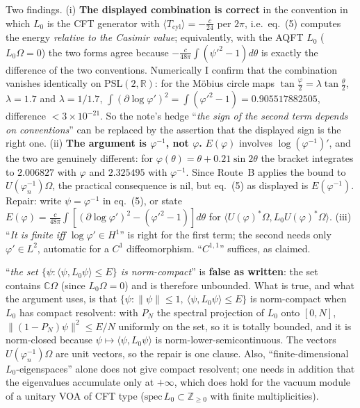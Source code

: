 \documentclass[11pt]{article}
\begin{document}
\begin{verdictgap}
Two findings.
(i) \textbf{The displayed combination is correct} in the convention in which $L_0$ is the CFT generator with
$\langle T_{\mathrm{cyl}}\rangle=-\frac c{24}$ per $2\pi$, i.e.\ eq.~(5) computes the energy \emph{relative to the
Casimir value}; equivalently, with the AQFT $L_0$ ($L_0\Omega=0$) the two forms agree because
$-\frac c{48\pi}\int(\psi'^2-1)d\theta$ is exactly the difference of the two conventions.  Numerically I confirm
that the combination vanishes identically on $\mathrm{PSL}(2,\mathbb R)$: for the M\"obius circle maps
$\tan\frac\varphi2=\lambda\tan\frac\theta2$, $\lambda=1.7$ and $\lambda=1/1.7$,
$\int(\partial\log\varphi')^2=\int(\varphi'^2-1)=0.905517882505$, difference $<3\times10^{-21}$.  So the note's
hedge ``\emph{the sign of the second term depends on conventions}'' can be replaced by the assertion that the
displayed sign is the right one.
(ii) \textbf{The argument is $\varphi^{-1}$, not $\varphi$.}  $E(\varphi)$ involves $\log(\varphi^{-1})'$, and the
two are genuinely different: for $\varphi(\theta)=\theta+0.21\sin2\theta$ the bracket integrates to
$2.006827$ with $\varphi$ and $2.325495$ with $\varphi^{-1}$.  Since Route~B applies the bound to
$U(\varphi_n^{-1})\Omega$, the practical consequence is nil, but eq.~(5) as displayed is $E(\varphi^{-1})$.
Repair: write $\psi=\varphi^{-1}$ in eq.~(5), or state $E(\varphi)=\frac c{48\pi}\int[(\partial\log\varphi')^2-(\varphi'^2-1)]d\theta$
for $\langle U(\varphi)^*\Omega,L_0U(\varphi)^*\Omega\rangle$.
(iii) ``\emph{It is finite iff $\log\varphi'\in H^1$}'' is right for the first term; the second needs only
$\varphi'\in L^2$, automatic for a $C^1$ diffeomorphism.  ``$C^{1,1}$'' suffices, as claimed.
\end{verdictgap}
\begin{verdictgap}
``\emph{the set $\{\psi:\langle\psi,L_0\psi\rangle\le E\}$ is norm-compact}'' is \textbf{false as written}: the
set contains $\mathbb C\Omega$ (since $L_0\Omega=0$) and is therefore unbounded.  What is true, and what the
argument uses, is that $\{\psi:\|\psi\|\le1,\ \langle\psi,L_0\psi\rangle\le E\}$ is norm-compact when $L_0$ has
compact resolvent: with $P_N$ the spectral projection of $L_0$ onto $[0,N]$, $\|(1-P_N)\psi\|^2\le E/N$ uniformly
on the set, so it is totally bounded, and it is norm-closed because $\psi\mapsto\langle\psi,L_0\psi\rangle$ is
norm-lower-semicontinuous.  The vectors $U(\varphi_n^{-1})\Omega$ are unit vectors, so the repair is one clause.
Also, ``finite-dimensional $L_0$-eigenspaces'' alone does not give compact resolvent; one needs in addition that
the eigenvalues accumulate only at $+\infty$, which does hold for the vacuum module of a unitary VOA of CFT type
($\mathrm{spec}\,L_0\subset\mathbb Z_{\ge0}$ with finite multiplicities).
\end{verdictgap}
\end{document}
